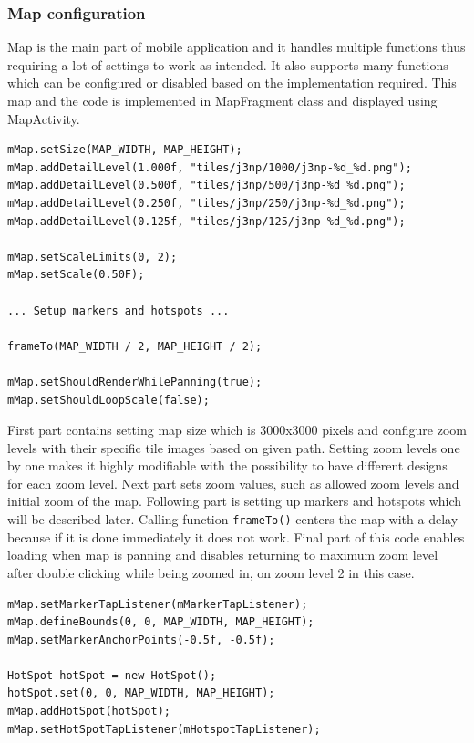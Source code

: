 \subsubsection{Map configuration}\label{subsubsec:MapConfiguration}
Map is the main part of mobile application and it handles multiple functions thus requiring a lot of settings to work as intended. It also supports many functions which can be configured or disabled based on the implementation required. This map and the code is implemented in MapFragment class and displayed using MapActivity.

\begin{lstlisting}[caption=Map configuration]
mMap.setSize(MAP_WIDTH, MAP_HEIGHT);
mMap.addDetailLevel(1.000f, "tiles/j3np/1000/j3np-%d_%d.png");
mMap.addDetailLevel(0.500f, "tiles/j3np/500/j3np-%d_%d.png");
mMap.addDetailLevel(0.250f, "tiles/j3np/250/j3np-%d_%d.png");
mMap.addDetailLevel(0.125f, "tiles/j3np/125/j3np-%d_%d.png");

mMap.setScaleLimits(0, 2); 
mMap.setScale(0.50F);

... Setup markers and hotspots ...

frameTo(MAP_WIDTH / 2, MAP_HEIGHT / 2);

mMap.setShouldRenderWhilePanning(true);
mMap.setShouldLoopScale(false);
\end{lstlisting}

First part contains setting map size which is 3000x3000 pixels and configure zoom levels with their specific tile images based on given path. Setting zoom levels one by one makes it highly modifiable with the possibility to have different designs for each zoom level. Next part sets zoom values, such as allowed zoom levels and initial zoom of the map. Following part is setting up markers and hotspots which will be described later. Calling function \verb|frameTo()| centers the map with a delay because if it is done immediately it does not work. Final part of this code enables loading when map is panning and disables returning to maximum zoom level after double clicking while being zoomed in, on zoom level 2 in this case.

\begin{lstlisting}[caption=Setup markers and hotspots]
mMap.setMarkerTapListener(mMarkerTapListener);
mMap.defineBounds(0, 0, MAP_WIDTH, MAP_HEIGHT);
mMap.setMarkerAnchorPoints(-0.5f, -0.5f);

HotSpot hotSpot = new HotSpot();
hotSpot.set(0, 0, MAP_WIDTH, MAP_HEIGHT);
mMap.addHotSpot(hotSpot);
mMap.setHotSpotTapListener(mHotspotTapListener);
\end{lstlisting}

